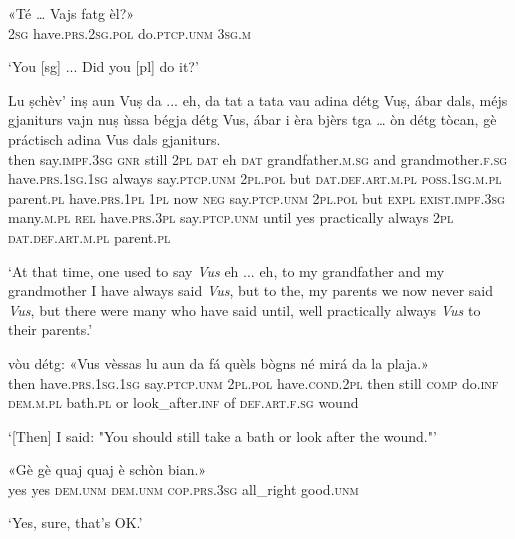 \begin{linenumbers}
\gll «Té\footnotemark{} … Vajs fatg èl?»   \\
 \textsc{2sg} {} have.\textsc{prs.2sg.pol} do.\textsc{ptcp.unm} \textsc{3sg.m}\\
\end{linenumbers}
\medskip
\glt `You [sg] ... Did you [pl] do it?'
\medskip

\begin{linenumbers}
\gll  Lu ṣchèv’ inṣ aun Vuṣ da ... eh, da tat a tata vau adina détg Vuṣ, ábar dals, méjs gjaniturs vajn nuṣ ùssa bégja détg Vus, ábar i èra bjèrs tga … òn détg tòcan, gè práctisch adina Vus dals gjaniturs.  \\
then say.\textsc{impf.3sg} \textsc{gnr} still  \textsc{2pl} \textsc{dat} {} eh \textsc{dat} grandfather.\textsc{m.sg} and grandmother.\textsc{f.sg} have.\textsc{prs.1sg.1sg} always say.\textsc{ptcp.unm} \textsc{2pl.pol} but \textsc{dat.def.art.m.pl} \textsc{poss.1sg.m.pl} parent.\textsc{pl}  have.\textsc{prs.1pl} \textsc{1pl} now \textsc{neg} say.\textsc{ptcp.unm} \textsc{2pl.pol} but \textsc{expl} \textsc{exist.impf.3sg} many.\textsc{m.pl} \textsc{rel} {} have.\textsc{prs.3pl} say.\textsc{ptcp.unm} until yes practically always \textsc{2pl} \textsc{dat.def.art.m.pl} parent.\textsc{pl}\\
\end{linenumbers}
\medskip
\glt `At that time, one used to say \textit{Vus} eh ... eh, to my grandfather and my grandmother I have always said \textit{Vus}, but to the, my parents we now never said \textit{Vus}, but there were many who have said until, well practically always \textit{Vus} to their parents.'
\medskip

\begin{linenumbers}
\gll  [Lu] vòu détg:  «Vus vèssas lu aun da fá quèls bògns né mirá da la plaja.»  \\
then have.\textsc{prs.1sg.1sg} say.\textsc{ptcp.unm} \textsc{2pl.pol}  have.\textsc{cond.2pl} then still \textsc{comp} do.\textsc{inf} \textsc{dem.m.pl} bath.\textsc{pl} or look\_after.\textsc{inf} of \textsc{def.art.f.sg} wound\\
\end{linenumbers}
\medskip
\glt `[Then] I said: "You should still take a bath or look after the wound."'
\medskip

\begin{linenumbers}
\gll  «Gè gè quaj quaj è schòn bian.»  \\
yes yes \textsc{dem.unm} \textsc{dem.unm} \textsc{cop.prs.3sg} all\_right good.\textsc{unm}  \\
\end{linenumbers}
\medskip
\glt `Yes, sure, that’s OK.'
\medskip

